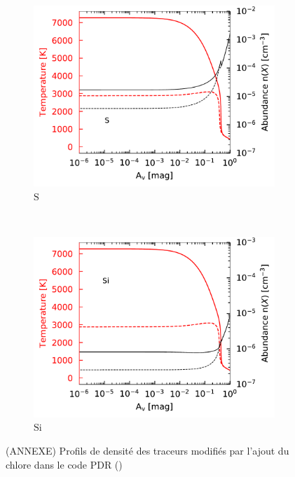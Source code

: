 \begin{figure}[!htbp]
    \begin{subfigure}[t]{0.49\textwidth} %
        \centering \includegraphics[trim = {0 0 0 0},clip,width=1\textwidth]{figure/Cl/gridModelEmiss/nT_comp_S.pdf}
        \caption{$\mathrm{S}$}
    \end{subfigure}
    ~
    \begin{subfigure}[t]{0.49\textwidth} %
        \centering \includegraphics[trim = {0 0 0 0},clip,width=1\textwidth]{figure/Cl/gridModelEmiss/nT_comp_Si.pdf}
        \caption{$\mathrm{Si}$}
    \end{subfigure}
    
    \caption{(ANNEXE) Profils de densité des traceurs modifiés par l'ajout du chlore dans le code PDR (\uncinq)}
    \label{fig:Cl:gridModelEmiss:nT:yes}
\end{figure}

